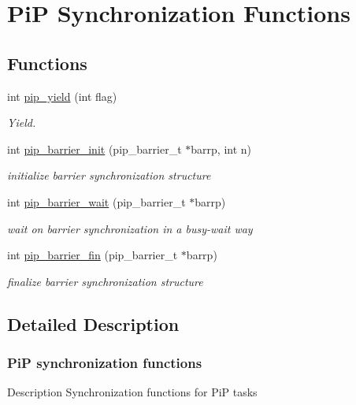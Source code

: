 \hypertarget{group__PiP-7-sync}{\section{Pi\-P Synchronization Functions}
\label{group__PiP-7-sync}
}
\subsection*{Functions}
\begin{DoxyCompactItemize}
\item 
int \hyperlink{group__PiP-7-sync_ga50469f21446ce86ea18ddd282cf15894}{pip\-\_\-yield} (int flag)
\begin{DoxyCompactList}\small\item\em Yield. \end{DoxyCompactList}\item 
int \hyperlink{group__PiP-7-sync_ga84022f9c64f431e7d513342aeed0b61e}{pip\-\_\-barrier\-\_\-init} (pip\-\_\-barrier\-\_\-t $\ast$barrp, int n)
\begin{DoxyCompactList}\small\item\em initialize barrier synchronization structure \end{DoxyCompactList}\item 
int \hyperlink{group__PiP-7-sync_gaca103c9732a8e28ee8faf79ef4a69e4f}{pip\-\_\-barrier\-\_\-wait} (pip\-\_\-barrier\-\_\-t $\ast$barrp)
\begin{DoxyCompactList}\small\item\em wait on barrier synchronization in a busy-\/wait way \end{DoxyCompactList}\item 
int \hyperlink{group__PiP-7-sync_ga70dab15271b84fe05d7088a6cf8bf784}{pip\-\_\-barrier\-\_\-fin} (pip\-\_\-barrier\-\_\-t $\ast$barrp)
\begin{DoxyCompactList}\small\item\em finalize barrier synchronization structure \end{DoxyCompactList}\end{DoxyCompactItemize}


\subsection{Detailed Description}
\hypertarget{pip-sync}{}\subsubsection{Pi\-P synchronization functions}\label{pip-sync}
\begin{DoxyParagraph}{Description}
Synchronization functions for Pi\-P tasks 
\end{DoxyParagraph}


